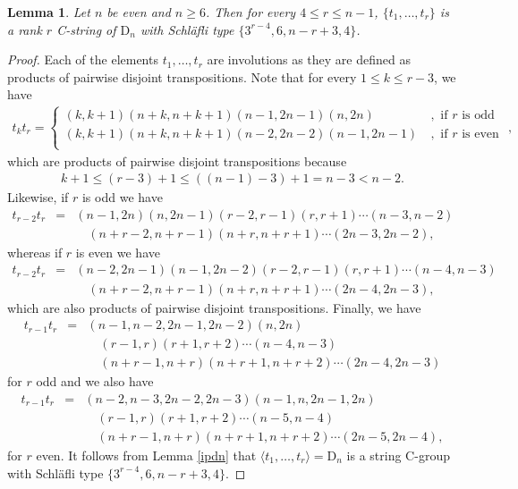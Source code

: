 \documentclass[10pt,a4paper]{amsart}
\newtheorem{lemma}{Lemma}
\begin{document}
\begin{lemma} \label{csr2}
Let $n$ be even and $n \ge 6$. Then for every $4 \leq r \leq n-1$, $\{t_1,\dots,t_r\}$ is a rank $r$ C-string of $\mathrm{D}_n$ with Schl\"{a}fli type $\{3^{r-4},6,n-r+3,4\}$.
\end{lemma}

\begin{proof}
Each of the elements $t_1,\dots,t_r$ are involutions as they are defined as products of pairwise disjoint transpositions. Note that for every $1 \leq k \leq r-3$, we have
\begin{eqnarray*}
t_k t_r = 
\begin{cases}
(k,k+1)(n+k,n+k+1)(n-1,2n-1)(n,2n) \ &, \text{ if $r$ is odd } \\ 
(k,k+1)(n+k,n+k+1)(n-2,2n-2)(n-1,2n-1) \ &, \text{ if $r$ is even } \\
\end{cases},
\end{eqnarray*}
which are products of pairwise disjoint transpositions because 
\begin{eqnarray*}
    k+1 \leq (r-3)+1 \leq ((n-1)-3)+1 = n-3 < n-2.
\end{eqnarray*}
Likewise, if $r$ is odd we have
\begin{eqnarray*}
t_{r-2} t_r &=& (n-1,2n)(n,2n-1) (r-2,r-1)(r,r+1)\cdots(n-3,n-2) \\ &\phantom{=}& \quad(n+r-2,n+r-1)(n+r,n+r+1)\cdots(2n-3,2n-2),
\end{eqnarray*}
whereas if $r$ is even we have
\begin{eqnarray*}
t_{r-2} t_r &=& (n-2,2n-1)(n-1,2n-2)(r-2,r-1)(r,r+1)\cdots(n-4,n-3) \\ &\phantom{=}&\quad (n+r-2,n+r-1)(n+r,n+r+1)\cdots(2n-4,2n-3),
\end{eqnarray*}
which are also products of pairwise disjoint transpositions. Finally, we have
\begin{eqnarray*}
t_{r-1} t_r &=& (n-1,n-2,2n-1,2n-2)(n,2n) \\ &\phantom{=}& \quad(r-1,r)(r+1,r+2)\cdots(n-4,n-3) \\ &\phantom{=}& \quad (n+r-1,n+r)(n+r+1,n+r+2)\cdots(2n-4,2n-3)
\end{eqnarray*}
for $r$ odd and we also have
\begin{eqnarray*}
t_{r-1} t_r &=& (n-2,n-3,2n-2,2n-3)(n-1,n,2n-1,2n) \\ &\phantom{=}&\quad (r-1,r)(r+1,r+2)\cdots(n-5,n-4) \\ &\phantom{=}&\quad (n+r-1,n+r)(n+r+1,n+r+2)\cdots(2n-5,2n-4),
\end{eqnarray*}
for $r$ even. It follows from Lemma \ref{ipdn} that $\langle t_1,\dots,t_r \rangle=\mathrm{D}_n$ is a string C-group with Schl\"{a}fli type $\{3^{r-4},6,n-r+3,4\}$.
\end{proof}
\end{document}
